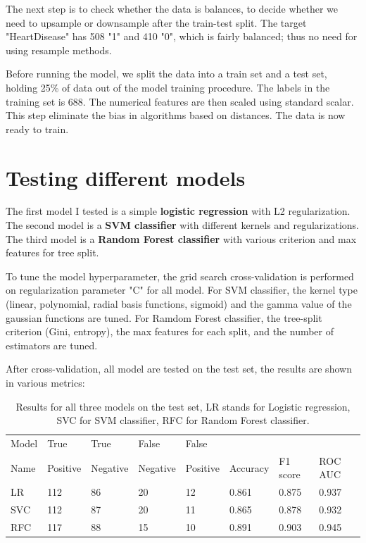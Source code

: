 \documentclass[11pt]{article}
\begin{document}
The next step is to check whether the data is balances, to decide whether we need to upsample or downsample after the train-test split. The target "HeartDisease" has 508 "1" and 410 "0", which is fairly balanced; thus no need for using resample methods.

Before running the model, we split the data into a train set and a test set, holding 25\% of data out of the model training procedure. The labels in the training set is 688.
The numerical features are then scaled using standard scalar. This step eliminate the bias in algorithms based on distances.
The data is now ready to train.

\section{Testing different models}\label{section-model}
The first model I tested is a simple \textbf{logistic regression} with L2 regularization.
The second model is a \textbf{SVM classifier} with different kernels and regularizations.
The third model is a \textbf{Random Forest classifier} with various criterion and max features for tree split.

To tune the model hyperparameter, the grid search cross-validation is performed on regularization parameter "C" for all model.
For SVM classifier, the kernel type (linear, polynomial, radial basis functions, sigmoid) and the gamma value of the gaussian functions are tuned.
For Ramdom Forest classifier, the tree-split criterion (Gini, entropy), the max features for each split, and the number of estimators are tuned.

After cross-validation, all model are tested on the test set, the results are shown in various metrics:

\begin{table}[h!]
\caption{Results for all three models on the test set, LR stands for Logistic regression, SVC for SVM classifier, RFC for Random Forest classifier.}
\begin{tabular}{llllllll}
\hline
\hline
Model & True  & True & False & False &  &   & \\
Name & Positive & Negative & Negative & Positive & Accuracy & F1 score & ROC AUC \\
\hline
LR & 112 & 86 & 20 & 12 & 0.861 & 0.875 & 0.937 \\
SVC & 112 & 87 & 20 & 11 & 0.865 & 0.878 & 0.932 \\
RFC & 117 & 88 & 15 & 10 & 0.891 & 0.903 & 0.945 \\
\hline
\hline
\end{tabular}
\end{table}
\end{document}
